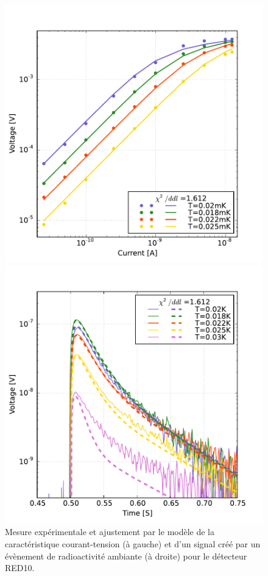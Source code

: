 \begin{figure}[!ht]
\begin{minipage}{0.49\textwidth}
\includegraphics[width=\textwidth]{Images/v2i_red10.pdf}
\end{minipage}
\hfill
\begin{minipage}{0.49\textwidth}
\includegraphics[width=\textwidth]{Images/pulse_red10.pdf}
\end{minipage}
\caption{Mesure expérimentale et ajustement par le modèle de la caractéristique courant-tension (à gauche) et  d'un signal créé par un évènement de radioactivité ambiante (à droite) pour le détecteur RED10.}
\label{v2i-red10}
\end{figure}

